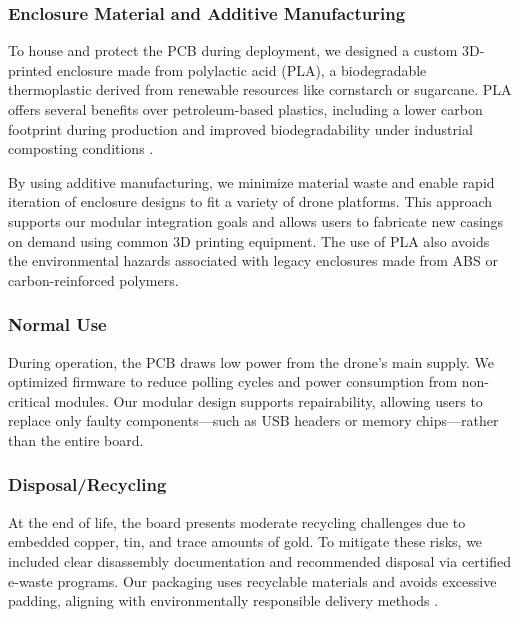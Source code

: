 \documentclass[12pt]{article}
\begin{document}
\subsubsection{Enclosure Material and Additive Manufacturing}

\par To house and protect the PCB during deployment, we designed a custom 3D-printed enclosure made from polylactic acid (PLA), a biodegradable thermoplastic derived from renewable resources like cornstarch or sugarcane. PLA offers several benefits over petroleum-based plastics, including a lower carbon footprint during production and improved biodegradability under industrial composting conditions \cite{natureworks_pla}.

\par By using additive manufacturing, we minimize material waste and enable rapid iteration of enclosure designs to fit a variety of drone platforms. This approach supports our modular integration goals and allows users to fabricate new casings on demand using common 3D printing equipment. The use of PLA also avoids the environmental hazards associated with legacy enclosures made from ABS or carbon-reinforced polymers.

\subsubsection{Normal Use}

\par During operation, the PCB draws low power from the drone’s main supply. We optimized firmware to reduce polling cycles and power consumption from non-critical modules. Our modular design supports repairability, allowing users to replace only faulty components—such as USB headers or memory chips—rather than the entire board.

\subsubsection{Disposal/Recycling}

\par At the end of life, the board presents moderate recycling challenges due to embedded copper, tin, and trace amounts of gold. To mitigate these risks, we included clear disassembly documentation and recommended disposal via certified e-waste programs. Our packaging uses recyclable materials and avoids excessive padding, aligning with environmentally responsible delivery methods \cite{goncalves_uav}.
\end{document}
